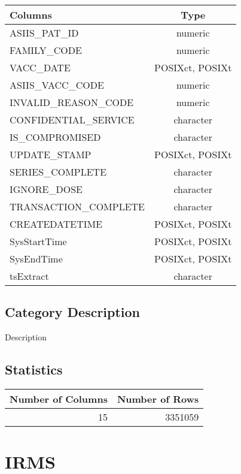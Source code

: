 \documentclass[
  letterpaper,
  DIV=11,
  numbers=noendperiod]{scrreprt}
\begin{document}
\begin{longtable}{lc}
\toprule
Columns & Type \\ 
\midrule
ASIIS\_PAT\_ID & numeric \\ 
FAMILY\_CODE & numeric \\ 
VACC\_DATE & POSIXct, POSIXt \\ 
ASIIS\_VACC\_CODE & numeric \\ 
INVALID\_REASON\_CODE & numeric \\ 
CONFIDENTIAL\_SERVICE & character \\ 
IS\_COMPROMISED & character \\ 
UPDATE\_STAMP & POSIXct, POSIXt \\ 
SERIES\_COMPLETE & character \\ 
IGNORE\_DOSE & character \\ 
TRANSACTION\_COMPLETE & character \\ 
CREATEDATETIME & POSIXct, POSIXt \\ 
SysStartTime & POSIXct, POSIXt \\ 
SysEndTime & POSIXct, POSIXt \\ 
tsExtract & character \\ 
\bottomrule
\end{longtable}

\hypertarget{category-description-14}{%
\section*{Category Description}\label{category-description-14}}

Description

\hypertarget{statistics-14}{%
\section*{Statistics}\label{statistics-14}}

\begin{longtable}{rr}
\toprule
Number of Columns & Number of Rows \\ 
\midrule
15 & 3351059 \\ 
\bottomrule
\end{longtable}

\hypertarget{irms}{%
\chapter*{IRMS}\label{irms}}
\end{document}
